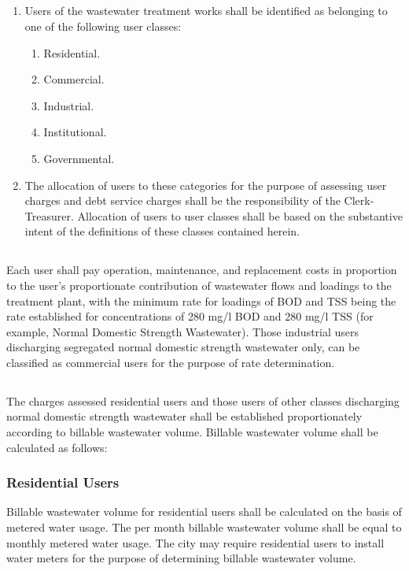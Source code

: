 \subsection{}
\begin{enumerate}
\item Users of the wastewater treatment works shall be identified as belonging to one of the following user classes:
    \begin{enumerate}[{\indent}a)]
        \item Residential.
        \item Commercial.
        \item Industrial.
        \item Institutional.
        \item Governmental.
    \end{enumerate}
\item The allocation of users to these categories for the purpose of assessing user charges and debt service charges shall be the responsibility of the Clerk-Treasurer.  Allocation of users to user classes shall be based on the substantive intent of the definitions of these classes contained herein.
\end{enumerate}
\subsection{}
Each user shall pay operation, maintenance, and replacement costs in proportion to the user’s proportionate contribution of wastewater flows and loadings to the treatment plant, with the minimum rate for loadings of BOD and TSS being the rate established for concentrations of 280 mg/l BOD and 280 mg/l TSS (for example, Normal Domestic Strength Wastewater).  Those industrial users discharging segregated normal domestic strength wastewater only, can be classified as commercial users for the purpose of rate determination.
\subsection{}
The charges assessed residential users and those users of other classes discharging normal domestic strength wastewater shall be established proportionately according to billable wastewater volume.  Billable wastewater volume shall be calculated as follows:
\subsubsection{Residential Users}
Billable wastewater volume for residential users shall be calculated on the basis of metered water usage.  The per month billable wastewater volume shall be equal to monthly metered water usage.  The city may require residential users to install water meters for the purpose of determining billable wastewater volume.
